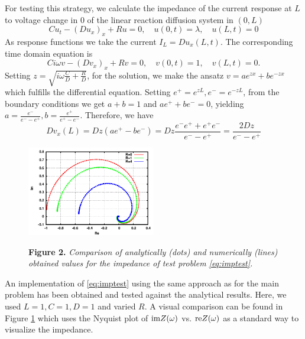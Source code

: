 \documentclass[english,nofirstpagebreak,empty]{amsproc}
\begin{document}
For testing this  strategy, we calculate the impedance  of the current
response  at $L$  to  voltage change  in  $0$ of  the linear  reaction
diffusion system in $(0,L)$
  \begin{equation}\label{eq:imptest}
      Cu_t - (Du_x)_x + Ru=0,\quad
      u(0,t)=\lambda,\quad
      u(L,t)=0
  \end{equation}
  As response functions we take the current  $I_L=Du_x(L,t)$.
  The corresponding time domain equation is
    \begin{equation*}
        Ci\omega v - (Dv_x)_x +Rv =0, \quad
        v(0,t)=1,\quad
        v(L,t)=0.
    \end{equation*}
    Setting $z=\sqrt{i\omega\frac{C}{D}+\frac{R}{D}}$, 
    for the solution, we make the ansatz
    $ v=ae^{zx}+be^{-zx}$
    which fulfills the differential equation.
    Setting $e^+=e^{zL},e^-=e^{-zL}$, from the boundary 
    conditions we get
    $ a+b=1 $ and 
   $ ae^++be^- =0$,
   yielding  $a=\frac{e^-}{e^--e^+},b=\frac{e^+}{e^+-e^-}$.
Therefore, we have
\begin{equation*}
  Dv_x(L)=Dz(ae^+-be^-)=Dz\frac{e^-e^++e^+e^-}{e^--e^+}=\frac{2Dz}{e^--e^+}
\end{equation*}

\begin{figure}[t]
  \centering
  \includegraphics[width=0.5\textwidth]{plot-imp}
  \label{fig:plotimp}

  {\small \textbf{Figure 2.} \emph{Comparison of analytically (dots) and numerically (lines)
    obtained values for the impedance of test problem
    \eqref{eq:imptest}.}}
\end{figure}

An implementation of \eqref{eq:imptest} using the same approach as for
the main problem  has been obtained and tested  against the analytical
results.   Here, we  used $L=1,  C=1, D=1$  and varied  $R$.  A visual
comparison can be found in Figure \ref{fig:plotimp} which uses the
Nyquist plot of  $\mbox{\rm im}Z(\omega)$ vs. $\mbox{\rm re}Z(\omega)$
as a standard way to visualize the impedance.
\end{document}
